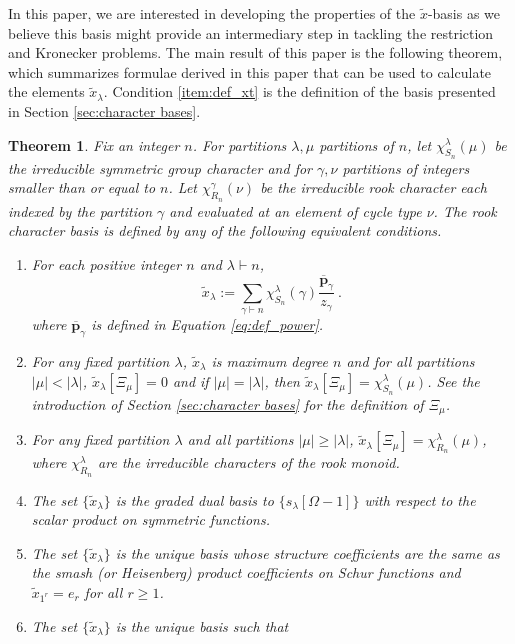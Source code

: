 \documentclass{amsart}
\newtheorem{theorem}[lemma]{Theorem}
\theoremstyle{definition}
\newcommand{\xt}{\tilde x}
\begin{document}
In this paper, we are interested in developing the properties of the $\xt$-basis
as we believe this basis might provide an intermediary step in tackling the
restriction and Kronecker problems.  The main result of this paper is the
following theorem, which summarizes formulae derived in this paper that
can be used to calculate the elements $\xt_\lambda$.
Condition \eqref{item:def_xt}
is the definition of the basis presented in Section \ref{sec:character bases}.
\begin{theorem} \label{theorem:TFAE}
Fix an integer $n$.  For partitions $\lambda, \mu$ partitions of $n$,
let $\chi^\lambda_{S_n}(\mu)$ be the irreducible symmetric group character and
for $\gamma, \nu$ partitions of integers smaller than or equal to $n$.  Let
$\chi^\gamma_{R_n}(\nu)$ be the irreducible rook character each indexed by the partition $\gamma$
and evaluated at an element of cycle type $\nu$.
The rook character basis is defined by any of the following equivalent conditions.
\begin{enumerate}
\item \label{item:def_xt} For each positive integer $n$ and $\lambda \vdash n$,
\[
\xt_\lambda := \sum_{\gamma \vdash n} \chi^\lambda_{S_n}(\gamma) \frac{{\overline{\mathbf p}}_\gamma}{z_\gamma}~.
\]
where ${\overline{\mathbf p}}_\gamma$ is defined in Equation \eqref{eq:def_power}.
\item \label{item:Sn_characters} For any fixed partition $\lambda$,
$\xt_\lambda$ is maximum degree $n$ and for all partitions $|\mu|<|\lambda|$,
$\xt_\lambda[\Xi_\mu] = 0$ and if $|\mu|=|\lambda|$, then $\xt_\lambda[\Xi_\mu] = \chi_{S_n}^\lambda(\mu)$.
See the introduction of Section \ref{sec:character bases} for the definition of $\Xi_\mu$.
\item \label{item:rook_characters} For any fixed partition $\lambda$ and all partitions $|\mu|\geq|\lambda|$,
$\xt_\lambda[\Xi_\mu]= \chi_{R_n}^\lambda(\mu)$, where $\chi_{R_n}^\lambda$ are the irreducible characters of the rook monoid.
\item \label{item:dual_basis} The set $\{ \xt_\lambda \}$ is the graded dual basis to
$\{ s_\lambda[\Omega - 1] \}$ with respect to the scalar product on symmetric functions.
\item \label{item:structure} The set $\{ \xt_\lambda \}$ is the unique basis whose
structure coefficients are the same as the
smash (or Heisenberg) product coefficients on Schur functions
and $\xt_{1^r} = e_r$ for all $r \geq 1$.
\item \label{item:ms_tableaux} The set $\{ \xt_\lambda \}$ is the unique basis such that

\end{enumerate}
\end{theorem}
\end{document}
